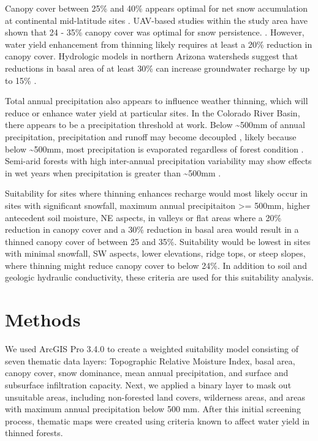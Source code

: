 \documentclass[
  number,
  preprint,
  3p,
  onecolumn]{elsarticle}
\begin{document}
Canopy cover between 25\% and 40\% appears optimal for net snow
accumulation at continental mid-latitude sites \citep{veatch2009}.
UAV-based studies within the study area have shown that 24 - 35\% canopy
cover was optimal for snow persistence.
\citep{donager2021, sankey_multi-scale_2015, belmonte_uav-based_2021}.
However, water yield enhancement from thinning likely requires at least
a 20\% reduction in canopy cover\citep{adams_ecohydrological_2012}.
Hydrologic models in northern Arizona watersheds suggest that reductions
in basal area of at least 30\% can increase groundwater recharge by up
to 15\% \citep{wyatt2015}.

Total annual precipitation also appears to influence weather thinning,
which will reduce or enhance water yield at particular sites. In the
Colorado River Basin, there appears to be a precipitation threshold at
work. Below \textasciitilde500mm of annual precipitation, precipitation
and runoff may become decoupled \citep{biederman_streamflow_2022},
likely because below \textasciitilde500mm, most precipitation is
evaporated regardless of forest condition \citep{hibbert1979}. Semi-arid
forests with high inter-annual precipitation variability may show
effects in wet years when precipitation is greater than
\textasciitilde500mm \citep{adams2012}.

Suitability for sites where thinning enhances recharge would most likely
occur in sites with significant snowfall, maximum annual precipitaiton
\textgreater= 500mm, higher antecedent soil moisture, NE aspects, in
valleys or flat areas where a 20\% reduction in canopy cover and a 30\%
reduction in basal area would result in a thinned canopy cover of
between 25 and 35\%. Suitability would be lowest in sites with minimal
snowfall, SW aspects, lower elevations, ridge tops, or steep slopes,
where thinning might reduce canopy cover to below 24\%. In addition to
soil and geologic hydraulic conductivity, these criteria are used for
this suitability analysis.

\section{Methods}\label{methods}

We used ArcGIS Pro 3.4.0 to create a weighted suitability model
consisting of seven thematic data layers: Topographic Relative Moisture
Index, basal area, canopy cover, snow dominance, mean annual
precipitation, and surface and subsurface infiltration capacity. Next,
we applied a binary layer to mask out unsuitable areas, including
non-forested land covers, wilderness areas, and areas with maximum
annual precipitation below 500 mm. After this initial screening process,
thematic maps were created using criteria known to affect water yield in
thinned forests.
\end{document}
